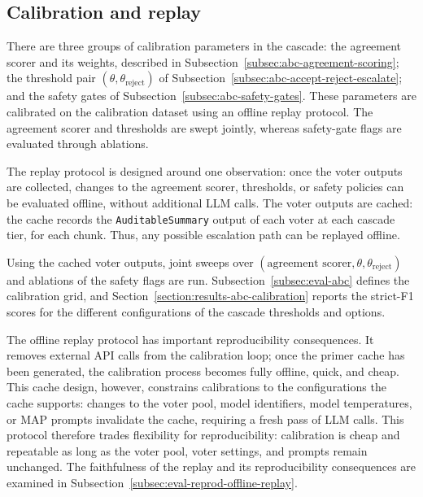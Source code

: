 \subsection{Calibration and replay}\label{subsec:abc-calibration-and-replay}

There are three groups of calibration parameters in the cascade: the agreement scorer and its weights, described in Subsection~\ref{subsec:abc-agreement-scoring}; the threshold pair $(\theta, \theta_{\mathrm{reject}})$ of Subsection~\ref{subsec:abc-accept-reject-escalate}; and the safety gates of Subsection~\ref{subsec:abc-safety-gates}. These parameters are calibrated on the calibration dataset using an offline replay protocol. The agreement scorer and thresholds are swept jointly, whereas safety-gate flags are evaluated through ablations. 

The replay protocol is designed around one observation: once the voter outputs are collected, changes to the agreement scorer, thresholds, or safety policies can be evaluated offline, without additional LLM calls. The voter outputs are cached: the cache records the \texttt{AuditableSummary} output of each voter at each cascade tier, for each chunk. Thus, any possible escalation path can be replayed offline. 

Using the cached voter outputs, joint sweeps over $(\text{agreement scorer}, \theta, \theta_{\mathrm{reject}})$ and ablations of the safety flags are run. Subsection~\ref{subsec:eval-abc} defines the calibration grid, and Section~\ref{section:results-abc-calibration} reports the strict-F1 scores for the different configurations of the cascade thresholds and options.

The offline replay protocol has important reproducibility consequences. It removes external API calls from the calibration loop; once the primer cache has been generated, the calibration process becomes fully offline, quick, and cheap. This cache design, however, constrains calibrations to the configurations the cache supports: changes to the voter pool, model identifiers, model temperatures, or MAP prompts invalidate the cache, requiring a fresh pass of LLM calls. This protocol therefore trades flexibility for reproducibility: calibration is cheap and repeatable as long as the voter pool, voter settings, and prompts remain unchanged. The faithfulness of the replay and its reproducibility consequences are examined in Subsection~\ref{subsec:eval-reprod-offline-replay}.